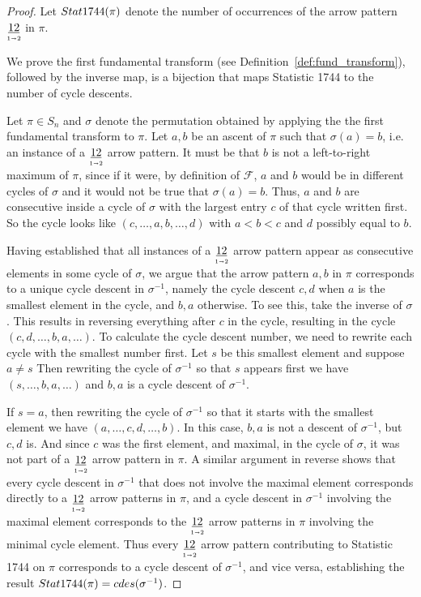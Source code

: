 \documentclass{amsart}
\theoremstyle{definition}
\newcommand{\arrowpattern}{\underset{\mathsmaller{1\shortrightarrow 2}}{\underline{12}}}
\newcommand{\cdes}{\textnormal{cdes}}
\newcommand{\Stat}{\textnormal{Stat}}
\begin{document}
\begin{proof}
  Let $\Stat1744(\pi)$ denote the number of occurrences of the arrow pattern $\arrowpattern$ in $\pi$.


  We prove the first fundamental transform (see Definition~\ref{def:fund_transform}), followed by the inverse map, is a bijection that maps  Statistic 1744 to the number of cycle descents.

  Let $\pi\in S_n$ and $\sigma$ denote the permutation obtained by applying the the first fundamental transform to $\pi$. Let $a,b$ be an ascent of $\pi$ such that  $\sigma(a)=b$, i.e. an instance of a $\arrowpattern$ arrow pattern. It must be that $b$ is not a left-to-right maximum of $\pi$, since if it were, by definition of $\mathcal{F}$, $a$ and $b$ would be in different cycles of $\sigma$ and it would not be true that $\sigma(a)=b$.  Thus, $a$ and $b$ are consecutive inside a cycle of $\sigma$ with the largest entry $c$ of that cycle written first. So the cycle looks like $(c,\ldots,a,b,\ldots,d)$ with $a<b<c$ and $d$ possibly equal to $b$.

  Having established that all instances of a $\arrowpattern$ arrow pattern appear as consecutive elements in some cycle of $\sigma$, we argue that the arrow pattern $a,b$ in $\pi$ corresponds to a unique cycle descent in $\sigma^{-1}$, namely the cycle descent $c,d$ when $a$ is the smallest element in the cycle, and $b,a$ otherwise.
  To see this, take the inverse of $\sigma$. This results in reversing everything after $c$ in the cycle, resulting in the cycle $(c,d,\ldots,b,a,\ldots)$. To calculate the cycle descent number, we need to rewrite each cycle with the smallest number first.  Let $s$ be this smallest element and suppose $a\not=s$  Then rewriting the cycle of $\sigma^{-1}$ so that $s$ appears first we have $(s,\ldots,b,a,
    \ldots)$ and $b,a$ is a cycle descent of $\sigma^{-1}$.

  If $s=a$, then rewriting the cycle of $\sigma^{-1}$ so that it starts with the smallest element we have $(a,\ldots,c,d,\ldots, b)$.  In this case, $b,a$ is not a descent of $\sigma^{-1}$, but $c,d$ is.  And since $c$ was the first element, and maximal, in the cycle of $\sigma$, it was not part of a $\arrowpattern$ arrow pattern in $\pi.$
  A similar argument in reverse shows that every cycle descent in $\sigma^{-1}$ that does not involve the maximal element corresponds directly to a $\arrowpattern$ arrow patterns in $\pi$, and a cycle descent in $\sigma^{-1}$ involving the maximal element corresponds to the $\arrowpattern$ arrow patterns in $\pi$ involving the minimal cycle element.
  Thus every $\arrowpattern$ arrow pattern contributing to Statistic 1744 on $\pi$ corresponds to a cycle descent of $\sigma^{-1}$, and vice versa, establishing the result $\Stat1744(\pi)=\cdes(\sigma^{-1})$.
 \end{proof}
\end{document}
